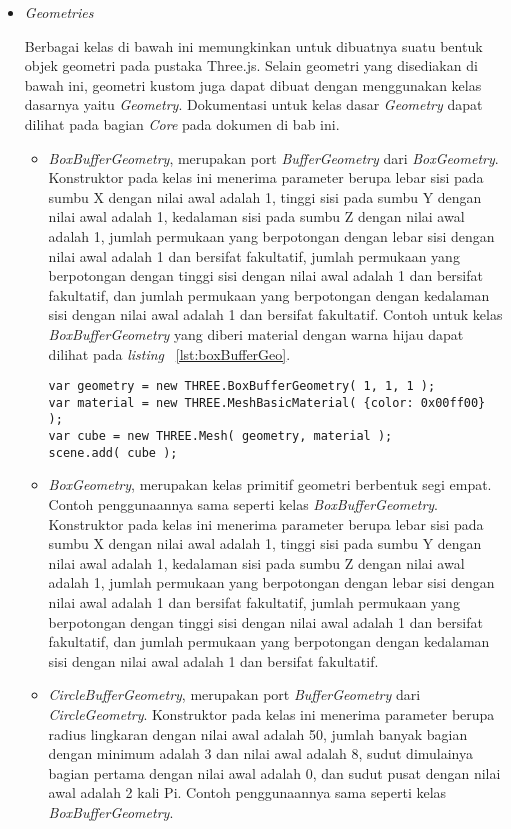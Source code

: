 \begin{itemize}
	\item \textit{Geometries}
	
	Berbagai kelas di bawah ini memungkinkan untuk dibuatnya suatu bentuk objek geometri pada pustaka Three.js. Selain geometri yang disediakan di bawah ini, geometri kustom juga dapat dibuat dengan menggunakan kelas dasarnya yaitu {\it Geometry}. Dokumentasi untuk kelas dasar {\it Geometry} dapat dilihat pada bagian {\it Core} pada dokumen di bab ini.
	
	\begin{itemize}
		\item {\it BoxBufferGeometry}, merupakan port {\it BufferGeometry} dari {\it BoxGeometry}. Konstruktor pada kelas ini menerima parameter berupa lebar sisi pada sumbu X dengan nilai awal adalah 1, tinggi sisi pada sumbu Y dengan nilai awal adalah 1, kedalaman sisi pada sumbu Z dengan nilai awal adalah 1, jumlah permukaan yang berpotongan dengan lebar sisi dengan nilai awal adalah 1 dan bersifat fakultatif,  jumlah permukaan yang berpotongan dengan tinggi sisi dengan nilai awal adalah 1 dan bersifat fakultatif,  dan jumlah permukaan yang berpotongan dengan kedalaman sisi dengan nilai awal adalah 1 dan bersifat fakultatif. Contoh untuk kelas {\it BoxBufferGeometry} yang diberi material dengan warna hijau dapat dilihat pada {\it listing} ~\ref{lst:boxBufferGeo}.
\begin{lstlisting}[caption={Contoh penggunaan kelas {\it BoxBufferGeometry}.}, label={lst:boxBufferGeo},captionpos=b]
var geometry = new THREE.BoxBufferGeometry( 1, 1, 1 );
var material = new THREE.MeshBasicMaterial( {color: 0x00ff00} );
var cube = new THREE.Mesh( geometry, material );
scene.add( cube );
\end{lstlisting}
		\item {\it BoxGeometry}, merupakan kelas primitif geometri berbentuk segi empat. Contoh penggunaannya sama seperti kelas {\it BoxBufferGeometry}. Konstruktor pada kelas ini menerima parameter berupa lebar sisi pada sumbu X dengan nilai awal adalah 1, tinggi sisi pada sumbu Y dengan nilai awal adalah 1, kedalaman sisi pada sumbu Z dengan nilai awal adalah 1, jumlah permukaan yang berpotongan dengan lebar sisi dengan nilai awal adalah 1 dan bersifat fakultatif,  jumlah permukaan yang berpotongan dengan tinggi sisi dengan nilai awal adalah 1 dan bersifat fakultatif,  dan jumlah permukaan yang berpotongan dengan kedalaman sisi dengan nilai awal adalah 1 dan bersifat fakultatif.
		\item {\it CircleBufferGeometry}, merupakan port {\it BufferGeometry} dari {\it CircleGeometry}. Konstruktor pada kelas ini menerima parameter berupa radius lingkaran dengan nilai awal adalah 50, jumlah banyak bagian dengan minimum adalah 3 dan nilai awal adalah 8, sudut dimulainya bagian pertama dengan nilai awal adalah 0, dan sudut pusat dengan nilai awal adalah 2 kali Pi. Contoh penggunaannya sama seperti kelas {\it BoxBufferGeometry}.

\end{itemize}
\end{itemize}
